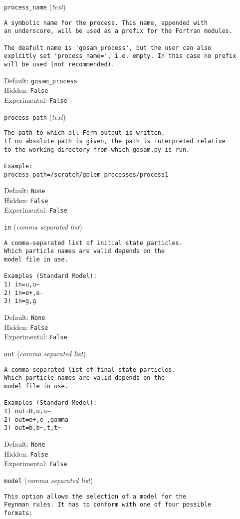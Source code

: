 \begin{basedescript}{\desclabelstyle{\pushlabel}}
\setlength\itemsep{30pt}
\item[\colorbox{gray!30}{\texttt{process\_name}}] (\textit{text})
\begin{verbatim}
A symbolic name for the process. This name, appended with
an underscore, will be used as a prefix for the Fortran modules.

The deafult name is 'gosam_process', but the user can also
explcitly set 'process_name=', i.e. empty. In this case no prefix
will be used (not recommended).
\end{verbatim}
Default: \verb|gosam_process|
\\Hidden: \verb|False|
\\Experimental: \verb|False|
\\\item[\colorbox{gray!30}{\texttt{process\_path}}] (\textit{text})
\begin{verbatim}
The path to which all Form output is written.
If no absolute path is given, the path is interpreted relative
to the working directory from which gosam.py is run.

Example:
process_path=/scratch/golem_processes/process1
\end{verbatim}
Default: \verb|None|
\\Hidden: \verb|False|
\\Experimental: \verb|False|
\\\item[\colorbox{gray!30}{\texttt{in}}] (\textit{comma separated list})
\begin{verbatim}
A comma-separated list of initial state particles.
Which particle names are valid depends on the
model file in use.

Examples (Standard Model):
1) in=u,u~
2) in=e+,e-
3) in=g,g
\end{verbatim}
Default: \verb|None|
\\Hidden: \verb|False|
\\Experimental: \verb|False|
\\\item[\colorbox{gray!30}{\texttt{out}}] (\textit{comma separated list})
\begin{verbatim}
A comma-separated list of final state particles.
Which particle names are valid depends on the
model file in use.

Examples (Standard Model):
1) out=H,u,u~
2) out=e+,e-,gamma
3) out=b,b~,t,t~
\end{verbatim}
Default: \verb|None|
\\Hidden: \verb|False|
\\Experimental: \verb|False|
\\\item[\colorbox{gray!30}{\texttt{model}}] (\textit{comma separated list})
\begin{verbatim}
This option allows the selection of a model for the
Feynman rules. It has to conform with one of four possible
formats:


\end{verbatim}
\end{basedescript}
